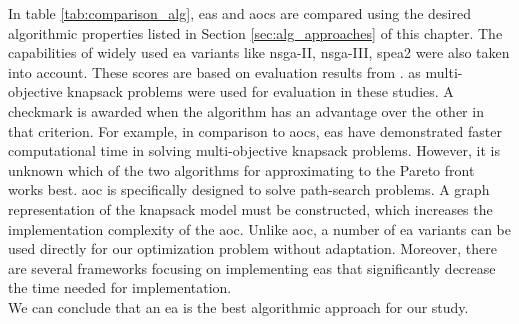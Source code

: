 In table \ref{tab:comparison_alg}, \glspl{ea} and \glspl{aoc} are compared using the desired algorithmic properties listed in Section \ref{sec:alg_approaches} of this chapter. The capabilities of widely used \gls{ea} variants like \gls{nsga}-II, \gls{nsga}-III, \gls{spea}2 were also taken into account. These scores are based on evaluation results from \parencite{Lust2012TheApproach, Florios2010SolvingAlgorithms, Alaya2007AntProblems}. as multi-objective knapsack problems were used for evaluation in these studies. A checkmark is awarded when the algorithm has an advantage over the other in that criterion. For example, in comparison to \glspl{aoc}, \glspl{ea} have demonstrated faster computational time in solving multi-objective knapsack problems. However, it is unknown which of the two algorithms for approximating to the Pareto front works best. \gls{aoc} is specifically designed to solve path-search problems. A graph representation of the knapsack model must be constructed, which increases the implementation complexity of the \gls{aoc}. Unlike \gls{aoc}, a number of \gls{ea} variants can be used directly for our optimization problem without adaptation. Moreover, there are several frameworks focusing on implementing \glspl{ea} that significantly decrease the time needed for implementation.\\
We can conclude that an \gls{ea} is the best algorithmic approach for our study.



 



 